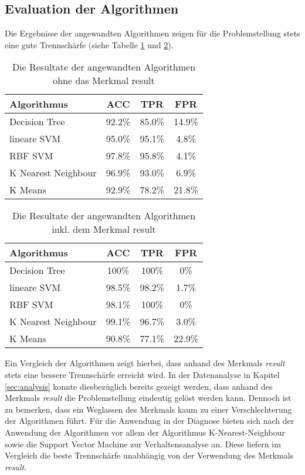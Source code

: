 \subsection{Evaluation der Algorithmen} \label{sec:evaluation}
Die Ergebnisse der angewandten Algorithmen zeigen für die Problemstellung stets eine gute Trennschärfe (siehe Tabelle \ref{tbl:results_table_without} und \ref{tbl:results_table}).

\begin{table}[htbp]
\caption{Die Resultate der angewandten Algorithmen ohne das Merkmal \glqq result\grqq}
\label{tbl:results_table_without}
\begin{tabular}{l c c c}
\textbf{Algorithmus} & \textbf{ACC} & \textbf{TPR} & \textbf{FPR} \\ \hline
Decision Tree & 92.2\% & 85.0\% & 14.9\% \\
lineare SVM & 95.0\% & 95.1\% & 4.8\% \\
RBF SVM & 97.8\% & 95.8\% & 4.1\% \\
K Nearest Neighbour & 96.9\% & 93.0\% & 6.9\%\\ 
K Means & 92.9\% & 78.2\% & 21.8\%\\ 
\end{tabular}
\centering
\end{table}

\begin{table}[htbp]
\caption{Die Resultate der angewandten Algorithmen inkl. dem Merkmal \glqq result\grqq}
\label{tbl:results_table}
\begin{tabular}{l c c c}
\textbf{Algorithmus} & \textbf{ACC} & \textbf{TPR} & \textbf{FPR} \\ \hline
Decision Tree & 100\% & 100\% & 0\% \\
lineare SVM & 98.5\% & 98.2\% & 1.7\% \\
RBF SVM & 98.1\% & 100\% & 0\% \\
K Nearest Neighbour & 99.1\% & 96.7\% & 3.0\%\\ 
K Means & 90.8\% & 77.1\% & 22.9\%\\ 
\end{tabular}
\centering
\end{table}

Ein Vergleich der Algorithmen zeigt hierbei, dass anhand des Merkmals \textit{result} stets eine bessere Trennschärfe erreicht wird. In der Datenanalyse in Kapitel \ref{sec:analysis} konnte diesbezüglich bereits gezeigt werden, dass anhand des Merkmals \textit{result} die Problemstellung eindeutig gelöst werden kann. Dennoch ist zu bemerken, dass ein Weglassen des Merkmals kaum zu einer Verschlechterung der Algorithmen führt. Für die Anwendung in der Diagnose bieten sich nach der Anwendung der Algorithmen vor allem der Algorithmus K-Nearest-Neighbour sowie die Support Vector Machine zur Verhaltensanalyse an. Diese liefern im Vergleich die beste Trennschärfe unabhängig von der Verwendung des Merkmals \textit{result}.